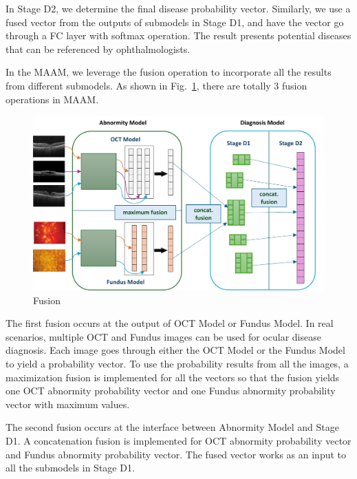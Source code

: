 \documentclass{article}
\begin{document}
	\vspace{0.2cm}
	
	In Stage D2, we determine the final disease probability vector. Similarly, we use a fused vector from the outputs of submodels in Stage D1, and have the vector go through a FC layer with softmax operation. The result presents potential diseases that can be referenced by ophthalmologists.

	\vspace{0.5cm}
	
	In the MAAM, we leverage the fusion operation to incorporate all the results from different submodels. As shown in Fig.~\ref{fig:fusion}, there are totally 3 fusion operations in MAAM.
	
	\begin{figure}[htbp]
		\centering
		\includegraphics[width=\linewidth]{Figs/fusion.pdf}
		\caption{Fusion}
		\vspace{0.3cm}
		\label{fig:fusion}
	\end{figure}

	The first fusion occurs at the output of OCT Model or Fundus Model. In real scenarios, multiple OCT and Fundus images can be used for ocular disease diagnosis. Each image goes through either the OCT Model or the Fundus Model to yield a probability vector. To use the probability results from all the images, a maximization fusion is implemented for all the vectors so that the fusion yields one OCT abnormity probability vector and one Fundus abnormity probability vector with maximum values.
	
	The second fusion occurs at the interface between Abnormity Model and Stage D1. A concatenation fusion is implemented for OCT abnormity probability vector and Fundus abnormity probability vector. The fused vector works as an input to all the submodels in Stage D1.
	
\end{document}
